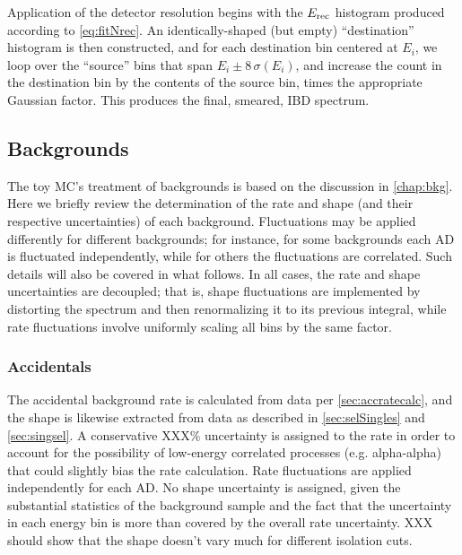 \documentclass[../thesis.tex]{subfiles}
\begin{document}
Application of the detector resolution begins with the $E_\mathrm{rec}$ histogram
produced according to \autoref{eq:fitNrec}. An identically-shaped (but empty)
``destination'' histogram is then constructed, and for each destination bin
centered at $E_i$, we loop over the ``source'' bins that span $E_i \pm
8\,\sigma(E_i)$, and increase the count in the destination bin by the contents
of the source bin, times the appropriate Gaussian factor. This produces the
final, smeared, IBD spectrum.

\subsection{Backgrounds}
\label{sec:fitToyBackgrounds}

The toy MC's treatment of backgrounds is based on the discussion in
\autoref{chap:bkg}. Here we briefly review the determination of the rate and
shape (and their respective uncertainties) of each background. Fluctuations may
be applied differently for different backgrounds; for instance, for some
backgrounds each AD is fluctuated independently, while for others the
fluctuations are correlated. Such details will also be covered in what
follows. In all cases, the rate and shape uncertainties are decoupled; that is,
shape fluctuations are implemented by distorting the spectrum and then
renormalizing it to its previous integral, while rate fluctuations involve
uniformly scaling all bins by the same factor.

\subsubsection{Accidentals}

The accidental background rate is calculated from data per
\autoref{sec:accratecalc}, and the shape is likewise extracted from data as
described in \autoref{sec:selSingles} and \autoref{sec:singsel}. A conservative
XXX\% uncertainty is assigned to the rate in order to account for the
possibility of low-energy correlated processes (e.g. alpha-alpha) that could
slightly bias the rate calculation. Rate fluctuations are applied independently
for each AD. No shape uncertainty is assigned, given the substantial statistics
of the background sample and the fact that the uncertainty in each energy bin is
more than covered by the overall rate uncertainty. XXX should show that the
shape doesn't vary much for different isolation cuts.

\subsubsection{\LiHe}
\end{document}
